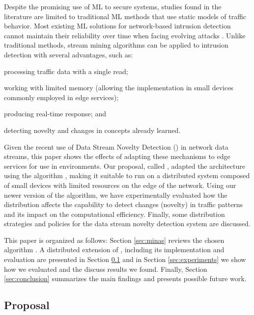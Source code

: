 Despite the promising use of ML to secure \iot systems, studies found in the
literature \cite{buczak2016survey,mitchell2014survey,Tahsien2020} are limited to
traditional ML methods that use static models of traffic behavior.
Most existing ML solutions for network-based intrusion detection cannot maintain
their reliability over time when facing evolving attacks \cite{Viegas2019,AndreoniLopez2019}.
Unlike traditional methods, stream mining algorithms can be applied to intrusion
detection with several advantages, such as:
\begin{enumerate*}[label=(\emph{\roman*})]
    \item processing traffic data with a single read;
    \item working with limited memory (allowing the implementation in small
    devices commonly employed in edge services);
    \item producing real-time response; and
    \item detecting novelty and changes in concepts already learned.
\end{enumerate*}

Given the recent \cite{Viegas2019,AndreoniLopez2019,DaCosta2019a} use of Data Stream Novelty
Detection (\nd) in network data streams, this paper shows the effects of
adapting these mechanisms to edge services for use in \iot environments.
Our proposal, called \mfog, adapted the \arch
architecture \cite{Cassales2019a} using the \nd algorithm \minas
\cite{Faria2013Minas,Faria2015minas}, making it suitable to run
on a distributed system composed of small devices with limited
resources on the edge of the network.
Using our newer version of the \minas algorithm, we have experimentally evaluated 
how the distribution 
affects the capability to detect changes (novelty) in
traffic patterns and its impact on the computational efficiency.
Finally, some distribution strategies and policies for the data stream
novelty detection system are discussed.

This paper is organized as follows:
Section \ref{sec:minas} reviews the chosen \nd algorithm \minas.
A distributed extension of \minas, including its
implementation and evaluation are presented in Section \ref{sec:prop}
and in Section \ref{sec:experiments} we show how we evaluated \mfog and
the discuss results we found.
Finally, Section \ref{sec:conclusion} summarizes the main findings and presents
possible future work.

\subsection{Proposal}
\label{sec:prop}

